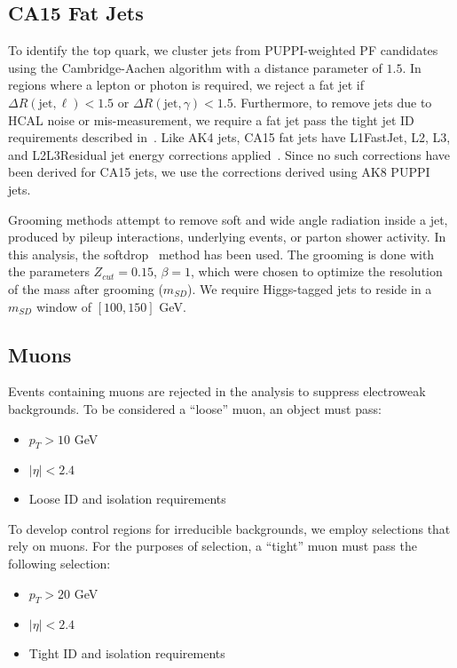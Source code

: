 \subsection{CA15 Fat Jets}\label{sec:fatjets}
To identify the top quark, we cluster jets from PUPPI-weighted PF candidates using the Cambridge-Aachen algorithm with a distance parameter of $1.5$. 
In regions where a lepton or photon is required, we reject a fat jet if $\Delta R(\text{jet},\ell)<1.5$ or $\Delta R(\text{jet},\gamma)<1.5$.
Furthermore, to remove jets due to HCAL noise or mis-measurement, we require a fat jet pass the tight jet ID requirements described in~\cite{CMS_AN_2016-473}.
Like AK4 jets, CA15 fat jets have L1FastJet, L2, L3, and L2L3Residual jet energy corrections applied~\cite{JEC_TWIKI}. 
Since no such corrections have been derived for CA15 jets, we use the corrections derived using AK8 PUPPI jets.

Grooming methods attempt to remove soft and wide angle radiation inside a jet, produced by pileup interactions, underlying events, or parton shower activity. In this analysis, the softdrop~\cite{msd} method has been used. The grooming is done with the parameters $Z_{cut} = 0.15$,  $\beta = 1$, which were chosen to optimize the resolution of the mass after grooming ($m_{SD}$). We require Higgs-tagged jets to reside in a $m_{SD}$ window of $[100,150]$ GeV.



\subsection{Muons}
\label{subsec:muons}

Events containing muons are rejected in the analysis to suppress electroweak backgrounds. 
To be considered a ``loose'' muon, an object must pass:
\begin{itemize}
  \item $p_T>10$ GeV
  \item $|\eta|<2.4$
  \item Loose ID and isolation requirements \cite{CMS-MUO-TWIKI-IDLOOSE}
\end{itemize}

To develop control regions for irreducible backgrounds, we employ selections that rely on muons.
For the purposes of selection, a ``tight'' muon must pass the following selection:
\begin{itemize}
  \item $p_T>20$ GeV
  \item $|\eta|<2.4$
  \item Tight ID and isolation requirements \cite{CMS-MUO-TWIKI-IDTIGHT}
\end{itemize}

